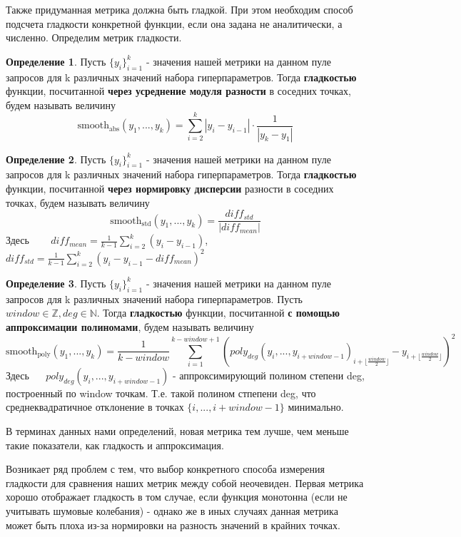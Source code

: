 \documentclass[12pt,a4paper]{amsart}
\theoremstyle{definition}
\newtheorem{definition}{Определение}[section]
\theoremstyle{definition}
\newcommand{\Sum}{\sum\limits}
\renewcommand\b{\textbf}
\begin{document}
Также придуманная метрика должна быть гладкой. При этом необходим способ подсчета гладкости конкретной функции, если она задана не аналитически, а численно. Определим метрик гладкости.

\begin{definition}
Пусть $\{y_i\}_{i=1}^k$ - значения нашей метрики на данном пуле запросов для k различных значений набора гиперпараметров. Тогда \b{гладкостью} функции, посчитанной \b{через усреднение модуля разности} в соседних точках, будем называть величину 
$$\text{smooth}_\text{abs}(y_1,...,y_k) = \Sum_{i=2}^k |y_i - y_{i-1}| \cdot \frac{1}{|y_k - y_1|}$$
\end{definition}

\begin{definition}
Пусть $\{y_i\}_{i=1}^k$ - значения нашей метрики на данном пуле запросов для k различных значений набора гиперпараметров. Тогда \b{гладкостью} функции, посчитанной \b{через нормировку дисперсии} разности в соседних точках, будем называть величину 
$$\text{smooth}_\text{std}(y_1,...,y_k) = \frac{diff_{std}}{|diff_{mean}|}$$
Здесь ~~~ $diff_{mean} = \frac{1}{k - 1} \Sum_{i=2}^k (y_i - y_{i-1})$, ~~~
$diff_{std} = \frac{1}{k - 1} \Sum_{i=2}^k (y_i - y_{i-1} - diff_{mean})^2$
\end{definition}

\begin{definition}
Пусть $\{y_i\}_{i=1}^k$ - значения нашей метрики на данном пуле запросов для k различных значений набора гиперпараметров. Пусть $window \in \mathbb{Z}, deg \in \mathbb{N}$. Тогда \b{гладкостью} функции, посчитанной \b{с помощью аппроксимации полиномами}, будем называть величину
$$\text{smooth}_\text{poly}(y_1,...,y_k) = \frac{1}{k - window}\Sum_{i=1}^{k - window + 1} \left(poly_{deg}(y_i,...,y_{i + window - 1})_{i + \lfloor{\frac{window}{2}}\rfloor} - y_{i + \lfloor{\frac{window}{2}}\rfloor}\right)^2$$
Здесь ~~ $poly_{deg}(y_i,...,y_{i + window - 1})$ - аппроксимирующий полином степени deg, построенный по window точкам. Т.е. такой полином стпепени deg, что среднеквадратичное отклонение в точках $\{i,...,i + window - 1\}$ минимально.
\end{definition}

В терминах данных нами определений, новая метрика тем лучше, чем меньше такие показатели, как гладкость и аппроксимация.

Возникает ряд проблем с тем, что выбор конкретного способа измерения гладкости для сравнения наших метрик между собой неочевиден. Первая метрика хорошо отображает гладкость в том случае, если функция монотонна (если не учитывать шумовые колебания) - однако же в иных случаях данная метрика может быть плоха из-за нормировки на разность значений в крайних точках. 
\end{document}
